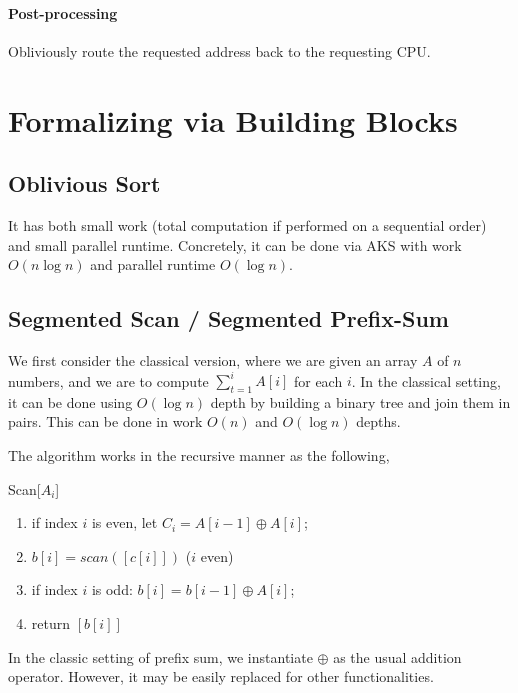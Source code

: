      \paragraph{Post-processing} Obliviously route the requested address back to the requesting CPU.
     
   \section{Formalizing via Building Blocks}
   \subsection{Oblivious Sort} It has both small work (total computation if performed on a sequential order) and small parallel runtime. Concretely, it can be done via AKS with work $O(n\log n)$ and parallel runtime $O(\log n)$.
   \subsection{Segmented Scan / Segmented Prefix-Sum}
   We first consider the classical version, where we are given an array $A$ of $n$ numbers, and we are to compute $\sum_{t=1}^i A[i]$ for each $i$. In the classical setting, it can be done using $O(\log n)$ depth by building a binary tree and join them in pairs. This can be done in work $O(n)$ and  $O(\log n)$  depths.
   
   The algorithm works in the recursive manner as the following,   \begin{algorithm}\caption{Scan[$A_i$]}\begin{enumerate}
   	\item  if index $i$ is even, let $C_i = A[i-1] \oplus A[i]$;
   	\item $b[i] = scan([c[i]])$ ($i$ even)
   	\item if index $i$ is odd: $b[i] = b[i-1] \oplus A[i]$;
   	\item return $[b[i] ]$ 
   \end{enumerate}
   	
   \begin{remark}
   	In the classic setting of prefix sum, we instantiate $\oplus$ as the usual addition operator. However, it may be easily replaced for other functionalities.
   \end{remark}	
   \end{algorithm}
   
